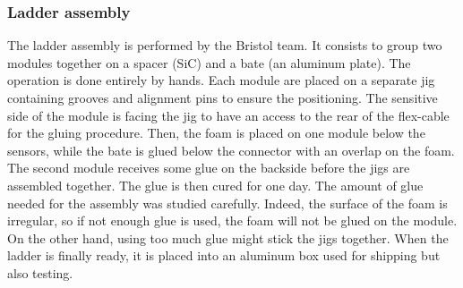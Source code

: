 

    \subsubsection{Ladder assembly}

    The ladder assembly is performed by the Bristol team.
    It consists to group two modules together on a spacer (\gls{SiC}) and a bate (an aluminum plate).
    The operation is done entirely by hands.
    Each module are placed on a separate jig containing grooves and alignment pins to ensure the positioning.
    The sensitive side of the module is facing the jig to have an access to the rear of the flex-cable for the gluing procedure.
    Then, the foam is placed on one module below the sensors, while the bate is glued below the connector with an overlap on the foam.
    The second module receives some glue on the backside before the jigs are assembled together.
    The glue is then cured for one day.
    The amount of glue needed for the assembly was studied carefully. 
    Indeed, the surface of the foam is irregular, so if not enough glue is used, the foam will not be glued on the module.
    On the other hand, using too much glue might stick the jigs together.
    When the ladder is finally ready, it is placed into an aluminum box used for shipping but also testing.
   
